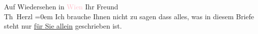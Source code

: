 \pstart
           Auf Wiedersehen in \textcolor{pink}{Wien}\ledrightnote{\textcolor{pink}{Wien}}{\\[\baselineskip]} Ihr Freund{\\[\baselineskip]}\spacefill\mbox{Th Herzl}\pend
           \leftskip=0em{}
\pstart
           \noindent{}Ich brauche Ihnen nicht zu sagen dass alles, was in diesem Briefe steht nur \uline{für Sie allein} geschrieben ist.\pend
           \endnumbering{}  \newcommand{\dateiname}{L03830}\newcommand{\titel}{Theodor Herzl an Arthur Schnitzler, 15. 6. 1893}\newcommand{\editorInnen}{Selma Jahnke und Martin Anton Müller}
